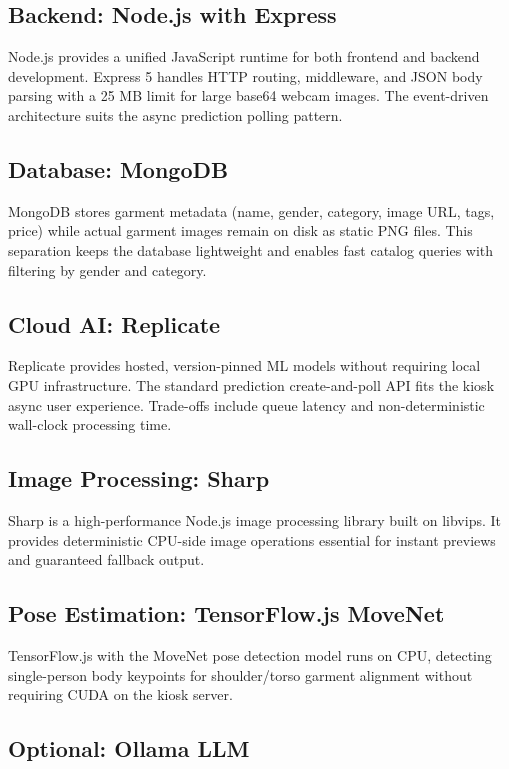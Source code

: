 \subsection{Backend: Node.js with Express}

Node.js provides a unified JavaScript runtime for both frontend and backend development. Express 5 handles HTTP routing, middleware, and JSON body parsing with a 25 MB limit for large base64 webcam images. The event-driven architecture suits the async prediction polling pattern.

\subsection{Database: MongoDB}

MongoDB stores garment metadata (name, gender, category, image URL, tags, price) while actual garment images remain on disk as static PNG files. This separation keeps the database lightweight and enables fast catalog queries with filtering by gender and category.

\subsection{Cloud AI: Replicate}

Replicate provides hosted, version-pinned ML models without requiring local GPU infrastructure. The standard prediction create-and-poll API fits the kiosk async user experience. Trade-offs include queue latency and non-deterministic wall-clock processing time.

\subsection{Image Processing: Sharp}

Sharp is a high-performance Node.js image processing library built on libvips. It provides deterministic CPU-side image operations essential for instant previews and guaranteed fallback output.

\subsection{Pose Estimation: TensorFlow.js MoveNet}

TensorFlow.js with the MoveNet pose detection model runs on CPU, detecting single-person body keypoints for shoulder/torso garment alignment without requiring CUDA on the kiosk server.

\subsection{Optional: Ollama LLM}

